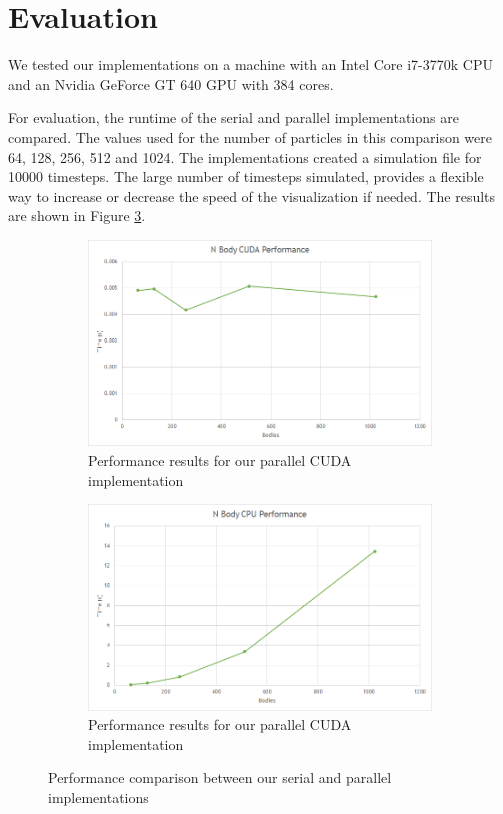 \documentclass[11pt,a4paper]{article}
\begin{document}
	\section{Evaluation}
	We tested our implementations on a machine with an Intel Core i7-3770k CPU and an Nvidia GeForce GT 640 GPU with 384 cores. 
	
	For evaluation, the runtime of the serial and parallel implementations are compared. The values used for the number of particles in this comparison were 64, 128, 256, 512 and 1024. The implementations created a simulation file for 10000 timesteps. The large number of timesteps simulated, provides a flexible way to increase or decrease the speed of the visualization if needed. The results are shown in Figure \ref{perf}.
	\begin{figure}
		\centering
		\begin{subfigure}[b]{0.45\textwidth}
			\includegraphics[width=\textwidth]{nbody_cuda.png}
			\caption{Performance results for our parallel CUDA implementation}
			\label{nbody_cuda}
		\end{subfigure}
		\begin{subfigure}[b]{0.45\textwidth}
			\includegraphics[width=\textwidth]{nbody_cpu.png}
			\caption{Performance results for our parallel CUDA implementation}
			\label{nbody_cpu}
		\end{subfigure}
		\caption{Performance comparison between our serial and parallel implementations}
		\label{perf}
	\end{figure}
	\pagebreak
	
\end{document}
